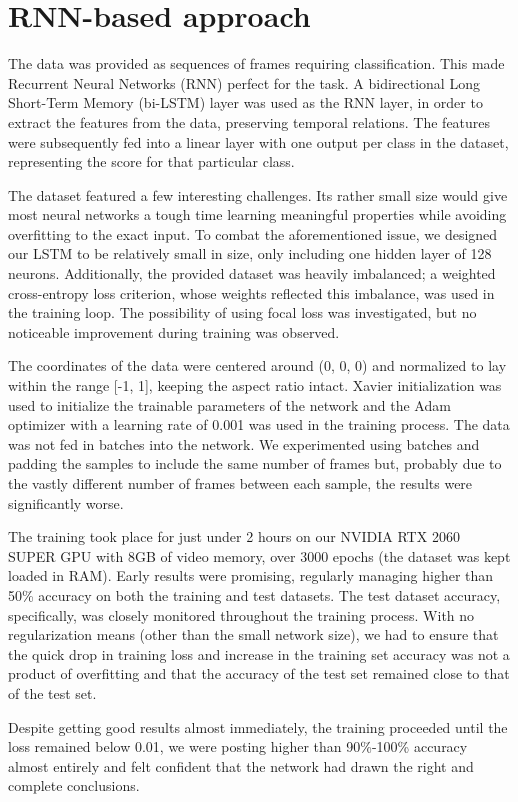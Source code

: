 \documentclass[times,twocolumn,final]{elsarticle}
\begin{document}

\linenumbers

\section{RNN-based approach}
The data was provided as sequences of frames requiring classification. This made Recurrent Neural Networks (RNN) perfect for the task. A bidirectional Long Short-Term Memory (bi-LSTM) layer was used as the RNN layer, in order to extract the features from the data, preserving temporal relations. The features were subsequently fed into a linear layer with one output per class in the dataset, representing the score for that particular class.

The dataset featured a few interesting challenges. Its rather small size would give most neural networks a tough time learning meaningful properties while avoiding overfitting to the exact input. To combat the aforementioned issue, we designed our LSTM to be relatively small in size, only including one hidden layer of 128 neurons. Additionally, the provided dataset was heavily imbalanced; a weighted cross-entropy loss criterion, whose weights reflected this imbalance, was used in the training loop. The possibility of using focal loss \cite{lin2017focal} was investigated, but no noticeable improvement during training was observed. 

The coordinates of the data were centered around (0, 0, 0) and normalized to lay within the range [-1, 1], keeping the aspect ratio intact. Xavier initialization \cite{glorot2010understanding} was used to initialize the trainable parameters of the network and the Adam optimizer with a learning rate of 0.001 was used in the training process. The data was not fed in batches into the network. We experimented using batches and padding the samples to include the same number of frames but, probably due to the vastly different number of frames between each sample, the results were significantly worse.

The training took place for just under 2 hours on our NVIDIA RTX\texttrademark{} 2060 SUPER GPU with 8GB of video memory, over 3000 epochs (the dataset was kept loaded in RAM). Early results were promising, regularly managing higher than 50\% accuracy on both the training and test datasets. The test dataset accuracy, specifically, was closely monitored throughout the training process. With no regularization means (other than the small network size), we had to ensure that the quick drop in training loss and increase in the training set accuracy was not a product of overfitting and that the accuracy of the test set remained close to that of the test set.

Despite getting good results almost immediately, the training proceeded until the loss remained below 0.01, we were posting higher than 90\%-100\% accuracy almost entirely and felt confident that the network had drawn the right and complete conclusions.




\end{document}
